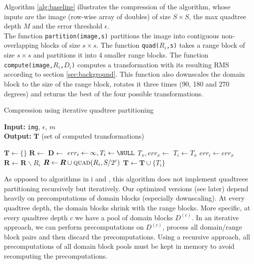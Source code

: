 Algorithm \ref{alg:baseline} illustrates the compression of the algorithm, whose inputs are the image (row-wise array of doubles) of size $S \times S$,
the max quadtree depth $M$ and the error threshold $\epsilon$.\\
The function \texttt{partition(image,s)} partitions the image into contiguous non-overlapping blocks of size $s \times s$.
The function \texttt{quad($R_i$,s)} takes a range block of size $s \times s$ and partitions it into 4 smaller range blocks.
The function \texttt{compute(image,$R_i$,$D_i$)} computes a transformation with its resulting RMS according to section \ref{sec:background}. 
This function also downscales the domain block to the size of the range block, rotates it three times (90, 180 and 270 degrees) 
and returns the best of the four possible transformations.
\begin{algorithm}
\caption{Compression using iterative quadtree partitioning}\label{alg:baseline}
\hspace*{\algorithmicindent} \textbf{Input:} \texttt{img}, $\epsilon$, $m$ \\
\hspace*{\algorithmicindent} \textbf{Output:} $\boldsymbol{T}$ (set of computed transformations)
\begin{algorithmic}[1]
  \State $\boldsymbol{T} \gets \{\}$
  \State $\boldsymbol{R} \gets $ 
        \State $\boldsymbol{D} \gets $ 
            \State $err_i \gets \infty, T_i \gets \NULL$
              \State $T_x, err_x \gets $ 
                \State $T_i \gets T_x$
                \State $err_i \gets err_x$
              \EndIf
            \EndFor
        \EndFor
        \State $\boldsymbol{R} \gets \boldsymbol{R} \backslash  R_i$
          \State $\boldsymbol{R} \gets \boldsymbol{R} \cup  \Call{quad}{R_i, S/2^c}$
        \Else
          \State $\boldsymbol{T} \gets \boldsymbol{T} \cup \{T_i\}$
        \EndIf
    \EndFor
\end{algorithmic}
\end{algorithm}

As opposed to algorithms in \cite{fisher2012}i and \cite{github-cpp}, this algorithm does not implement quadtreee
partitioning recursively but iteratively.
Our optimized versions (see later) depend heavily on precomputations of domain blocks (especially downscaling).
At every quadtree depth, the domain blocks shrink with the range blocks. More specific, at every quadtree depth $c$ we have a pool of
domain blocks $D^{(c)}$. In an iterative approach, we can perform precomputations on $D^{(c)}$, process all domain/range block pairs 
and then discard the precomputations. Using a recursive approach, all precomputations of all domain block pools must be kept in memory
to avoid recomputing the precomputations.

